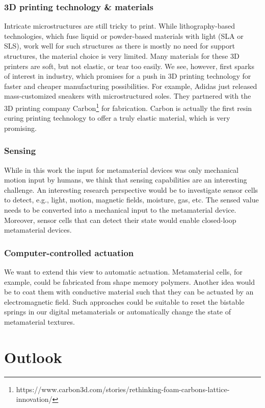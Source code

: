 \subsubsection{3D printing technology \& materials}
Intricate microstructures are still tricky to print. While lithography-based technologies, which fuse liquid or powder-based materials with light (SLA or SLS), work well for such structures as there is mostly no need for support structures, the material choice is very limited. Many materials for these 3D printers are soft, but not elastic, or tear too easily. We see, however, first sparks of interest in industry, which promises for a push in 3D printing technology for faster and cheaper manufacturing possibilities. For example, Adidas just released mass-customized sneakers with microstructured soles. They partnered with the 3D printing company Carbon\footnote{https://www.carbon3d.com/stories/rethinking-foam-carbons-lattice-innovation/} for fabrication. Carbon is actually the first resin curing printing technology to offer a truly elastic material, which is very promising. 

\subsubsection{Sensing}
While in this work the input for metamaterial devices was only mechanical motion input by humans, we think that sensing capabilities are an interesting challenge. 
An interesting research perspective would be to investigate sensor cells to detect, e.g., light, motion, magnetic fields, moisture, gas, etc. 
The sensed value needs to be converted into a mechanical input to the metamaterial device. 
Moreover, sensor cells that can detect their state would enable closed-loop metamaterial devices.


\subsubsection{Computer-controlled actuation}
We want to extend this view to automatic actuation. Metamaterial cells, for example, could be fabricated from shape memory polymers. Another idea would be to coat them with conductive material such that they can be actuated by an electromagnetic field. Such approaches could be suitable to reset the bistable springs in our digital metamaterials or automatically change the state of metamaterial textures.   


\section{Outlook}


